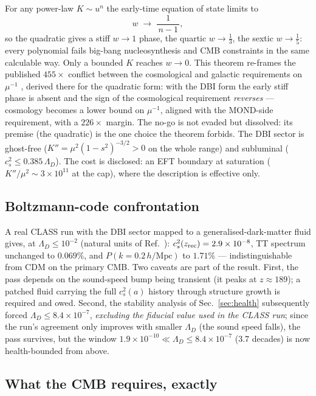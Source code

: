 \documentclass[aps,prd,twocolumn,10pt,nofootinbib,superscriptaddress]{revtex4-2}
\begin{document}
For any power-law $K\sim u^n$ the early-time equation of state limits to
\begin{equation}
w \;\longrightarrow\; \frac{1}{\,n-1\,},
\end{equation}
so the quadratic gives a stiff $w\to1$ phase, the quartic $w\to\tfrac13$, the sextic $w\to\tfrac15$:
every polynomial fails big-bang nucleosynthesis and CMB constraints in the same calculable way.
Only a bounded $K$ reaches $w\to0$. This theorem re-frames the published $455\times$ conflict
between the cosmological and galactic requirements on $\mu^{-1}$ \cite{BlanchetSkordis2024}, derived
there for the quadratic form: with the DBI form the early stiff phase is absent and the sign of the
cosmological requirement \emph{reverses} --- cosmology becomes a lower bound on $\mu^{-1}$, aligned
with the MOND-side requirement, with a $226\times$ margin. The no-go is not evaded but dissolved:
its premise (the quadratic) is the one choice the theorem forbids. The DBI sector is ghost-free
($K''=\mu^2(1-s^2)^{-3/2}>0$ on the whole range) and subluminal
($c_s^2\le0.385\,\Lambda_D$). The cost is disclosed: an EFT boundary at saturation
($K''/\mu^2\sim3\times10^{11}$ at the cap), where the description is effective only.

\subsection{Boltzmann-code confrontation}

A real CLASS run with the DBI sector mapped to a generalised-dark-matter fluid gives, at
$\Lambda_D\le10^{-2}$ (natural units of Ref.~\cite{SZ2021}): $c_s^2(z_{\rm rec})=2.9\times10^{-8}$,
TT spectrum unchanged to $0.069\%$, and $P(k=0.2\,h/\mathrm{Mpc})$ to $1.71\%$ --- indistinguishable
from CDM on the primary CMB. Two caveats are part of the result. First, the pass depends on the
sound-speed bump being transient (it peaks at $z\approx189$); a patched fluid carrying the full
$c_s^2(a)$ history through structure growth is required and owed. Second, the stability analysis of
Sec.~\ref{sec:health} subsequently forced $\Lambda_D\le8.4\times10^{-7}$, \emph{excluding the
fiducial value used in the CLASS run}; since the run's agreement only improves with smaller
$\Lambda_D$ (the sound speed falls), the pass survives, but the window
$1.9\times10^{-10}\ll\Lambda_D\le8.4\times10^{-7}$ (3.7 decades) is now health-bounded from above.

\subsection{What the CMB requires, exactly}
\end{document}

